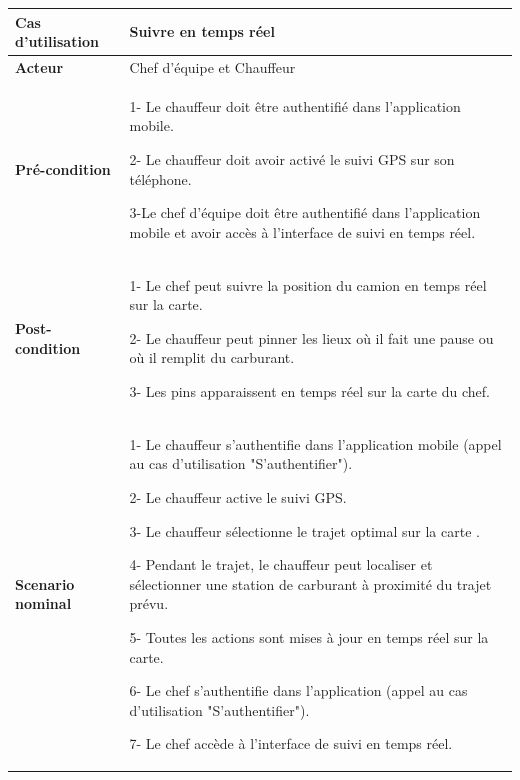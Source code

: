 \begin{table}[H]
    \centering
    \renewcommand{\arraystretch}{0.9}
    \begin{tabular}{|p{4cm}|p{9cm}|}
        \hline
        \textbf{Cas d'utilisation} & Suivre en temps réel                                                                                           \\
        \hline
        \textbf{Acteur}            & Chef d'équipe et Chauffeur                                                                                     \\
        \hline
        \textbf{Pré-condition}     & 1- Le chauffeur doit être authentifié dans l'application mobile.\newline

        2- Le chauffeur doit avoir activé le suivi GPS sur son téléphone.\newline

        3-Le chef d'équipe doit être authentifié dans l'application mobile et avoir accès à l'interface de suivi en temps réel.                     \\


        \hline
        \textbf{Post-condition}    & 1- Le chef peut suivre la position du camion en temps réel sur la carte.
        \newline

        2- Le chauffeur peut pinner les lieux où il fait une pause ou où il remplit du carburant.\newline

        3- Les pins apparaissent en temps réel sur la carte du chef.                                                                                \\
        \hline
        \textbf{Scenario nominal}  & 1- Le chauffeur s'authentifie dans l'application mobile (appel au cas d'utilisation "S'authentifier").\newline

        2- Le chauffeur active le suivi GPS.\newline

        3- Le chauffeur sélectionne le trajet optimal sur la carte .\newline

        4- Pendant le trajet, le chauffeur peut localiser et sélectionner une station de carburant à proximité du trajet prévu.\newline

        5- Toutes les actions sont mises à jour en temps réel sur la carte.

        6- Le chef s'authentifie dans l'application (appel au cas d'utilisation "S'authentifier").\newline

        7- Le chef accède à l'interface de suivi en temps réel.                                                                                     \\
    \end{tabular}

\end{table}





